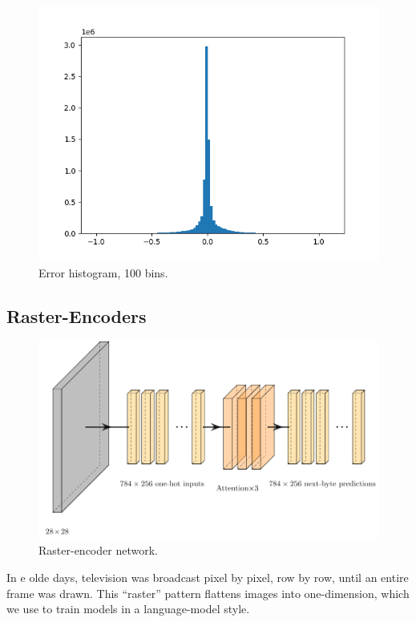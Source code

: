 \documentclass[11pt]{article}
\begin{document}
\begin{figure}[H]
  \centering
  \includegraphics[width=\columnwidth]{diagrams/hist.png}
  \caption{Error histogram, 100 bins.}
  \label{fig:hist}
\end{figure}

\subsection{Raster-Encoders}

\begin{figure}
  \centering
  \includegraphics[width=1.5\columnwidth]{diagrams/raster.pdf}
  \caption{Raster-encoder network.}
  \label{fig:raster}
\end{figure}

In \th e olde days, television was broadcast pixel by pixel, row by row, until an entire frame was drawn. This ``raster'' pattern flattens images into one-dimension, which we use to train models in a language-model style.
\end{document}
